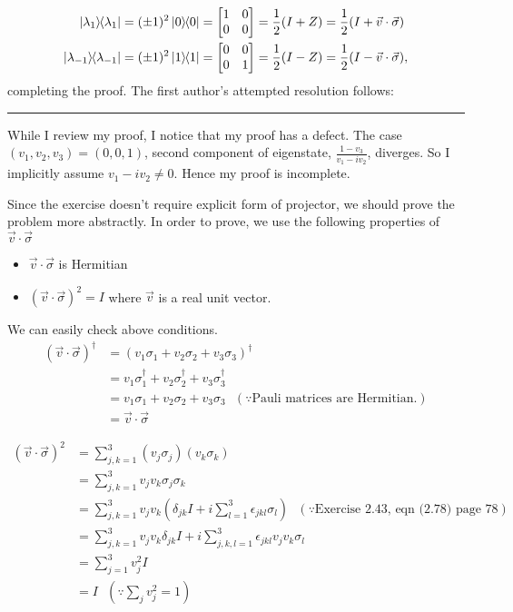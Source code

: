 \begin{align*}
\ket{\lambda_1}\hspace{-1mm} \bra{\lambda_1} = (\pm1)^2\ket{0}\hspace{-1mm} \bra{0} &= \begin{bmatrix}1&0\\0&0\end{bmatrix} = \frac{1}{2}(I+Z)=\frac{1}{2}(I+\vec{v}\cdot{\vec{\sigma}}) \\
\ket{\lambda_{-1}}\hspace{-1mm} \bra{\lambda_{-1}}=(\pm1)^2\ket{1}\hspace{-1mm} \bra{1} &=  \begin{bmatrix}0&0\\0&1\end{bmatrix} = \frac{1}{2}(I-Z)=\frac{1}{2}(I-\vec{v}\cdot{\vec{\sigma}}),
\end{align*}
completing the proof.  The first author's attempted resolution follows:
\vspace{5pt}
\hrule
\vspace{5pt}
	While I review my proof, I notice that my proof has a defect.
	The case $(v_1,v_2,v_3) = (0,0,1)$, second component of eigenstate, $\frac{1-v_3}{v_1 - iv_2}$, diverges.
	So I implicitly assume $v_1 - iv_2 \neq 0$. Hence my proof is incomplete.

	Since the exercise doesn't require explicit form of projector, we should prove the problem more abstractly.
	In order to prove, we use the following properties of $\vec{v} \cdot \vec{\sigma}$
	\begin{itemize}
		\item $\vec{v} \cdot \vec{\sigma}$ is Hermitian
		\item $(\vec{v} \cdot \vec{\sigma})^2 = I$ where $\vec{v}$ is a real unit vector.
	\end{itemize}

	We can easily check above conditions.
	\begin{align*}
	(\vec{v} \cdot \vec{\sigma})^\dagger &= (v_1 \sigma_1 + v_2 \sigma_2 + v_3 \sigma_3)^\dagger\\
	&= v_1 \sigma_1^\dagger + v_2 \sigma_2^\dagger + v_3 \sigma_3^\dagger\\
	&= v_1 \sigma_1 + v_2 \sigma_2 + v_3 \sigma_3~~~(\because \text{Pauli matrices are Hermitian.})\\
	&= \vec{v} \cdot \vec{\sigma}
	\end{align*}

	\begin{align*}
	(\vec{v} \cdot \vec{\sigma})^2 &= \sum_{j,k=1}^3 (v_j \sigma_j)  (v_k \sigma_k)\\
	&= \sum_{j,k=1}^3 v_j v_k \sigma_j \sigma_k\\
	&= \sum_{j,k=1}^3 v_j v_k \left(\delta_{jk}I + i \sum_{l=1}^3 \epsilon_{jkl}\sigma_l \right) ~~~(\because \text{Exercise 2.43, eqn (2.78) page 78})\\
	&= \sum_{j,k=1}^3 v_j v_k \delta_{jk}I  + i \sum_{j,k,l=1}^3 \epsilon_{jkl} v_j v_k \sigma_l\\
	&= \sum_{j=1}^3 v_j^2 I\\
	&= I ~~~\left(\because \sum_j v_j^2 = 1 \right)
	\end{align*}


